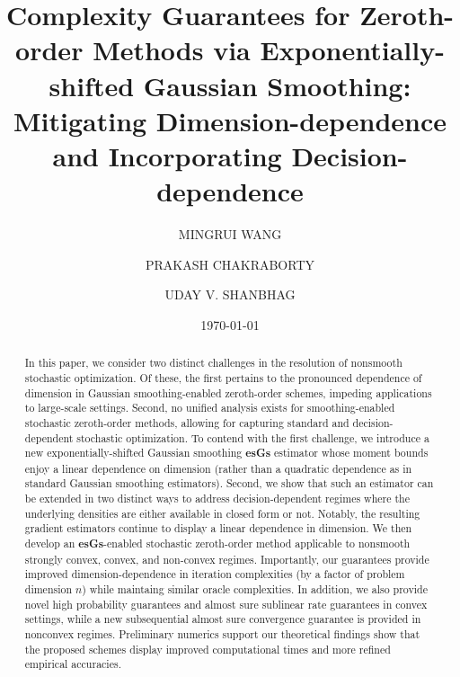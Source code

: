 \documentclass[11pt,reqno]{amsart}
\title[ESGS: Mitigating Dimension-dependence and Incorporating Decision-dependence]{Complexity Guarantees for Zeroth-order Methods via Exponentially-shifted Gaussian Smoothing: Mitigating Dimension-dependence and Incorporating Decision-dependence}
\author[MINGRUI WANG]{MINGRUI WANG}
\author[PRAKASH CHAKRABORTY]{PRAKASH CHAKRABORTY}
\author[UDAY V. SHANBHAG]{UDAY V. SHANBHAG}
\date{\today}
\newcommand{\1}{{\bf 1}}
\newcommand{\2}{{\bf 2}}
\numberwithin{equation}{section}
\theoremstyle{remark}
\begin{document}
	\maketitle
\begin{abstract}
In this paper, we consider two distinct challenges in the resolution of nonsmooth stochastic optimization. Of these, the first pertains to the pronounced dependence of dimension in Gaussian smoothing-enabled zeroth-order schemes, impeding applications to large-scale settings. Second, no unified analysis {exists} for smoothing-enabled stochastic zeroth-order methods, allowing for capturing standard and decision-dependent stochastic optimization. To contend with the first challenge, we introduce a  new exponentially-shifted Gaussian smoothing {\bf esGs} estimator whose moment bounds enjoy a linear dependence on dimension (rather than a quadratic dependence as in standard Gaussian smoothing estimators).   Second, we show that such an estimator can be extended in two distinct ways to address decision-dependent regimes where the underlying densities are either available in closed form or not. Notably, the resulting gradient estimators continue to display a linear dependence in dimension. We then develop an {\bf esGs}-enabled stochastic zeroth-order method applicable to nonsmooth strongly convex, convex, and {non-}convex regimes. Importantly, our guarantees provide improved dimension-dependence in iteration complexities (by a factor of problem dimension $n$) while maintaing similar oracle complexities. In addition,  we also provide novel high probability guarantees   and almost sure sublinear rate guarantees in convex settings, while a new subsequential almost sure convergence guarantee is provided in nonconvex regimes. Preliminary numerics support our theoretical findings  show that the proposed schemes display improved computational times and more refined empirical accuracies. 
\end{abstract}
\end{document}
